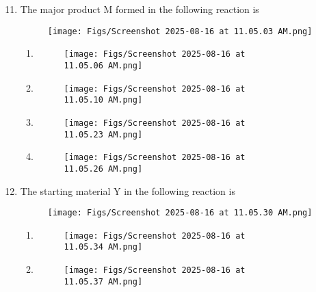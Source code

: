 \documentclass[12pt]{article}
\begin{document}
\begin{enumerate}
\setcounter{enumi}{10}



\item The major product M formed in the following reaction is
\begin{figure}[H]
\centering
\texttt{[image: Figs/Screenshot 2025-08-16 at 11.05.03 AM.png]}
\caption{}
\end{figure}

\begin{enumerate}
    \item \begin{figure}[H]
\centering
\texttt{[image: Figs/Screenshot 2025-08-16 at 11.05.06 AM.png]}
\caption{}
\end{figure}

\item  \begin{figure}[H]
\centering
\texttt{[image: Figs/Screenshot 2025-08-16 at 11.05.10 AM.png]}
\caption{}
\end{figure}


\item  \begin{figure}[H]
\centering
\texttt{[image: Figs/Screenshot 2025-08-16 at 11.05.23 AM.png]}
\caption{}
\end{figure}

\item  
\begin{figure}[H]
\centering
\texttt{[image: Figs/Screenshot 2025-08-16 at 11.05.26 AM.png]}
\caption{}
\end{figure}
\end{enumerate}


\item The starting material Y in the following reaction is
\begin{figure}[H]
\centering
\texttt{[image: Figs/Screenshot 2025-08-16 at 11.05.30 AM.png]}
\caption{}
\end{figure}

\begin{enumerate} 
    \item \begin{figure}[H]
\centering
\texttt{[image: Figs/Screenshot 2025-08-16 at 11.05.34 AM.png]}
\caption{}
\end{figure}

\item  \begin{figure}[H]
\centering
\texttt{[image: Figs/Screenshot 2025-08-16 at 11.05.37 AM.png]}
\caption{}
\end{figure}



\end{enumerate}
\end{enumerate}
\end{document}
